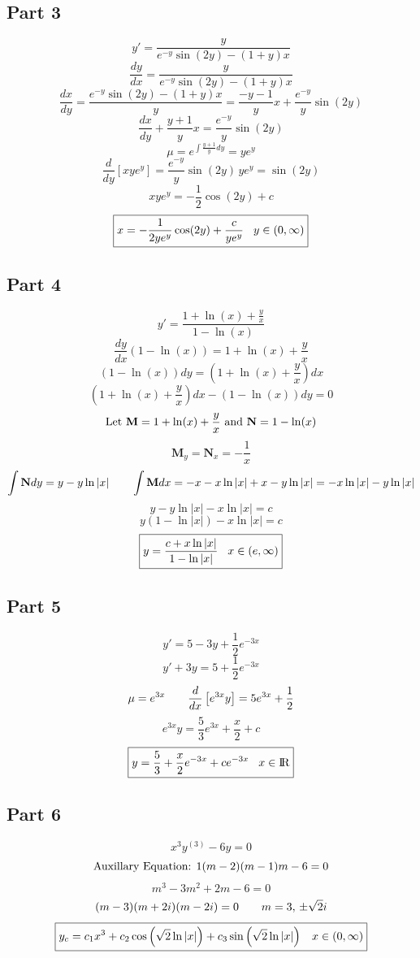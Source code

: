 \documentclass{article}
\begin{document}
\subsection*{Part 3}
\[y'=\frac{y}{e^{-y}\sin(2y)-(1+y)x}\]
\[\frac{dy}{dx}=\frac{y}{e^{-y}\sin(2y)-(1+y)x}\]
\[\frac{dx}{dy}=\frac{e^{-y}\sin(2y)-(1+y)x}{y}=\frac{-y-1}{y}x+\frac{e^{-y}}{y}\sin(2y)\]
\[\frac{dx}{dy}+\frac{y+1}{y}x=\frac{e^{-y}}{y}\sin(2y)\]
\[\mu=e^{\int\frac{y+1}{y}dy}=ye^y\]
\[\frac{d}{dy}\left[xye^y\right]=\frac{e^{-y}}{y}\sin(2y)\,ye^y=\sin(2y)\]
\[xye^y=-\frac{1}{2}\cos(2y)+c\]
\[\boxed{x=-\frac{1}{2ye^y}\cos(2y)+\frac{c}{ye^y}\hspace{3 mm}y\in(0,\infty)}\]
\subsection*{Part 4}
\[y'=\frac{1+\ln(x)+\frac{y}{x}}{1-\ln(x)}\]
\[\frac{dy}{dx}(1-\ln(x))=1+\ln(x)+\frac{y}{x}\]
\[(1-\ln(x))dy=\left(1+\ln(x)+\frac{y}{x}\right)dx\]
\[\left(1+\ln(x)+\frac{y}{x}\right)dx-(1-\ln(x))dy=0\]
\[\textnormal{Let } \textbf{M}=1+\ln(x)+\frac{y}{x} \textnormal{ and } \textbf{N}=1-\ln(x)\]
\[\textbf{M}_y=\textbf{N}_x=-\frac{1}{x}\]
\[\int\textbf{N}dy=y-y\ln|x|\hspace{7 mm}\int\textbf{M}dx=-x-x\ln|x|+x-y\ln|x|=-x\ln|x|-y\ln|x|\]
\[y-y\ln|x|-x\ln|x|=c\]
\[y(1-\ln|x|)-x\ln|x|=c\]
\[\boxed{y=\frac{c+x\ln|x|}{1-\ln|x|}\hspace{3 mm}x\in(e,\infty)}\]
\subsection*{Part 5}
\[y'=5-3y+\frac{1}{2}e^{-3x}\]
\[y'+3y=5+\frac{1}{2}e^{-3x}\]
\[\mu=e^{3x}\hspace{7 mm}\frac{d}{dx}\left[e^{3x}y\right]=5e^{3x}+\frac{1}{2}\]
\[e^{3x}y=\frac{5}{3}e^{3x}+\frac{x}{2}+c\]
\[\boxed{y=\frac{5}{3}+\frac{x}{2}e^{-3x}+ce^{-3x}\hspace{3 mm}x\in{\rm I\!R}}\]
\subsection*{Part 6}
\[x^3y^{(3)}-6y=0\]
\[\textnormal{Auxillary Equation: }1(m-2)(m-1)m-6=0\]
\[m^3-3m^2+2m-6=0\]
\[(m-3)(m+2i)(m-2i)=0\hspace{7 mm}m=3,\,\pm\sqrt{2}i\]
\[\boxed{y_c=c_1x^3+c_2\cos\left(\sqrt{2}\ln|x|\right)+c_3\sin\left(\sqrt{2}\ln|x|\right)\hspace{3 mm}x\in(0,\infty)}\]
\newpage
\end{document}
